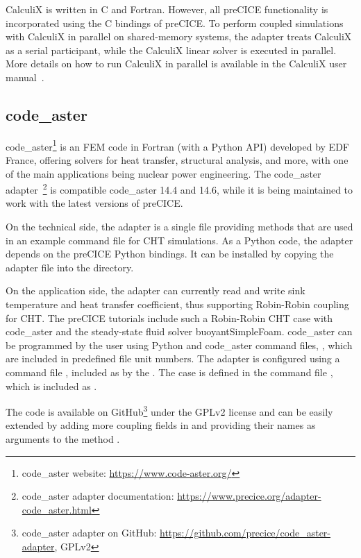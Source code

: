 CalculiX is written in C and Fortran. However, all preCICE functionality is incorporated using the C bindings of preCICE. To perform coupled simulations with CalculiX in parallel on shared-memory systems, the adapter treats CalculiX as a serial participant, while the CalculiX linear solver is executed in parallel. More details on how to run CalculiX in parallel is available in the CalculiX user manual~\cite{CalculiX_docs_217}.

\subsection{code\_aster}

code\_aster\footnote{code\_aster website: \url{https://www.code-aster.org/}} is an FEM code in Fortran (with a Python API) developed by EDF France,
offering solvers for heat transfer, structural analysis, and more, with one of the main applications being nuclear power engineering.
The code\_aster adapter~\cite{CheungYau2016}\footnote{code\_aster adapter documentation: \url{https://www.precice.org/adapter-code_aster.html}}
is compatible code\_aster 14.4 and 14.6, while it is being maintained to work with the latest versions of preCICE.

On the technical side, the adapter is a single  file providing methods that are used in an example
 command file for CHT simulations. As a Python code, the adapter depends on the preCICE Python bindings. It can be installed by copying the adapter file into the  directory.

On the application side, the adapter can currently read and write sink temperature and heat transfer coefficient, thus supporting Robin-Robin coupling for CHT.
The preCICE tutorials include such a Robin-Robin CHT case with code\_aster and the steady-state fluid solver buoyantSimpleFoam.
code\_aster can be programmed by the user using Python and code\_aster command files, , which are included in predefined file unit numbers.
The adapter is configured using a command file , included as  by the .
The case is defined in the command file , which is included as .

The code is available on GitHub\footnote{code\_aster adapter on GitHub: \url{https://github.com/precice/code_aster-adapter}, GPLv2}
under the GPLv2 license and can be easily extended by adding more coupling fields in 
and providing their names as arguments to the method .

